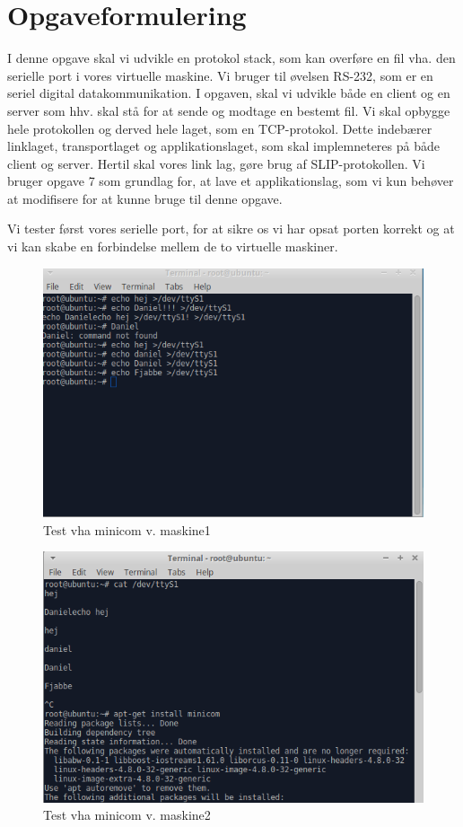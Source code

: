 \graphicspath{{Chapters/Hoejtalermontering/}}

\chapter{Opgaveformulering}

I denne opgave skal vi udvikle en protokol stack, som kan overføre en fil vha. den serielle port i vores virtuelle maskine. Vi bruger til øvelsen RS-232, som er en seriel digital datakommunikation. I opgaven, skal vi udvikle både en client og en server som hhv. skal stå for at sende og modtage en bestemt fil. 
Vi skal opbygge hele protokollen og derved hele laget, som en TCP-protokol. Dette indebærer linklaget, transportlaget og applikationslaget, som skal implemneteres på både client og server. Hertil skal vores link lag, gøre brug af SLIP-protokollen. Vi bruger opgave 7 som grundlag for, at lave et applikationslag, som vi kun behøver at modifisere for at kunne bruge til denne opgave. 

Vi tester først vores serielle port, for at sikre os vi har opsat porten korrekt og at vi kan skabe en forbindelse mellem de to virtuelle maskiner. 

\begin{figure}[H]
\centering
\includegraphics[width = 300 pt]{Img/opgave1.PNG}
\caption{Test vha minicom v. maskine1}
\label{fig:konceptbillede}
\end{figure}

\begin{figure}[H]
\centering
\includegraphics[width = 300 pt]{Img/opgave1_2.PNG}
\caption{Test vha minicom v. maskine2}
\label{fig:konceptbillede}
\end{figure}
    